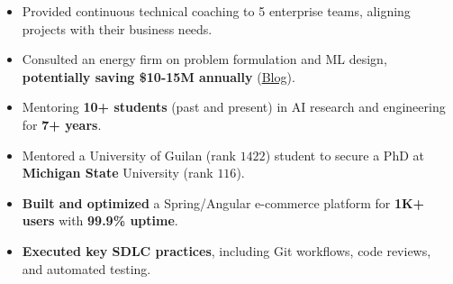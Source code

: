    
\begin{itemize}
    \item Provided continuous technical coaching to 5 enterprise teams, aligning projects with their business needs.
    \item Consulted an energy firm on problem formulation and ML design, \textbf{potentially saving \$10-15M annually} (\href{https://www.amii.ca/latest-from-amii/venturi-uses-machine-learning-reduce-emissions-increase-safety-pipelines/}{Blog}).
\end{itemize}

\begin{itemize}
    \item Mentoring \textbf{10+ students} (past and present) in AI research and engineering for \textbf{7+ years}.
    \item Mentored a University of Guilan (rank $1422$) student to secure a PhD at \textbf{Michigan State} University (rank $116$).
\end{itemize}

\begin{itemize}
    \item \textbf{Built and optimized} a Spring/Angular e-commerce platform for \textbf{1K+ users} with \textbf{99.9\% uptime}.
    \item \textbf{Executed key SDLC practices}, including Git workflows, code reviews, and automated testing.
\end{itemize}



